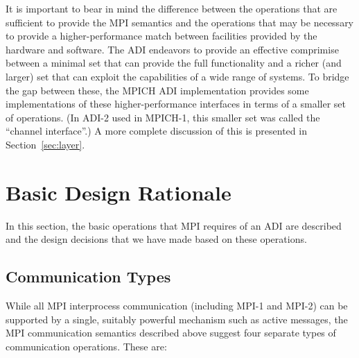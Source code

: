\documentclass{article}
\begin{document}
It is important to bear in mind the difference between the operations that are
sufficient to provide the MPI semantics and the operations that may be
necessary to provide a higher-performance match between facilities
provided by the hardware and software.  The ADI endeavors to provide
an effective comprimise between a minimal set that can provide the
full functionality and a richer (and larger) set that can exploit the
capabilities of a wide range of systems.  To bridge the gap between
these, the MPICH ADI implementation provides some implementations of
these higher-performance interfaces in terms of a smaller set of
operations.  (In ADI-2 used in MPICH-1, this smaller set was called
the ``channel interface''.)  A more complete discussion of this is
presented in Section~\ref{sec:layer}.

\section{Basic Design Rationale}
\label{sec:basic-design}
In this section, the basic operations that MPI requires of an ADI are
described and the design decisions that we have made based on these
operations.

\subsection{Communication Types}

While all MPI interprocess communication (including MPI-1 and MPI-2)
can be supported by a single, suitably powerful mechanism such as
active messages, the MPI communication semantics described above
suggest four separate types of communication operations.  These are:
\end{document}
